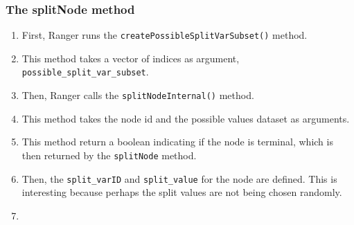 \documentclass[12pt,oneside]{book}
\begin{document}
\subsubsection{The splitNode method}

\begin{enumerate}
  \item First, Ranger runs the \lstinline|createPossibleSplitVarSubset()| method.
  \item This method takes a vector of indices as argument, \lstinline|possible_split_var_subset|.
  \item Then, Ranger calls the \lstinline|splitNodeInternal()| method.
  \item This method takes the node id and the possible values dataset as arguments.
  \item This method return a boolean indicating if the node is terminal, which is then returned by the \lstinline|splitNode| method.
  \item Then, the \lstinline|split_varID| and \lstinline|split_value| for the node are defined. This is interesting because perhaps the split values are not being chosen randomly.
  \item 
\end{enumerate}



  \printbibliography[title={Bibliografía},heading=bibintoc]
\end{document}
